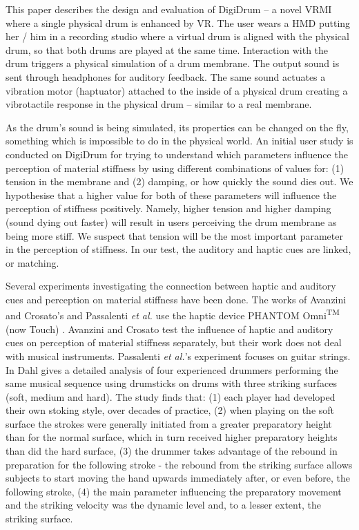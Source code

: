 \documentclass{article}
\begin{document}
This paper describes the design and evaluation of DigiDrum -- a novel VRMI where a single physical drum is enhanced by VR. The user wears a HMD putting her / him in a recording studio where a virtual drum is aligned with the physical drum, so that both drums are played at the same time. Interaction with the drum triggers a physical simulation of a drum membrane. The output sound is sent through headphones for auditory feedback. The same sound actuates a vibration motor (haptuator) attached to the inside of a physical drum creating a vibrotactile response in the physical drum -- similar to a real membrane.

As the drum's sound is being simulated, its properties can be changed on the fly, something which is impossible to do in the physical world. An initial user study is conducted on DigiDrum for trying to understand which parameters influence the perception of material stiffness by using different combinations of values for: (1) tension in the membrane and (2) damping, or how quickly the sound dies out. We hypothesise that a higher value for both of these parameters will influence the perception of stiffness positively. Namely, higher tension and higher damping (sound dying out faster) will result in users perceiving the drum membrane as being more stiff. We suspect that tension will be the most important parameter in the perception of stiffness. In our test, the auditory and haptic cues are linked, or matching. 

Several experiments investigating the connection between haptic and auditory cues and perception on material stiffness have been done. The works of 
Avanzini and Crosato's \cite{avanzini2006} and Passalenti \emph{et al.}  \cite{passalenti2019} use the haptic device PHANTOM\textregistered{} Omni\textsuperscript{TM} (now Touch) \cite{phantom}. Avanzini and Crosato test the influence of haptic and auditory cues on perception of material stiffness separately, but their work does not deal with musical instruments. Passalenti \emph{et al.}'s experiment focuses on guitar strings. In 
\cite{Dahl:2004} Dahl gives a detailed analysis of four experienced drummers performing the same musical sequence using drumsticks on drums with three striking surfaces (soft, medium and hard). The study finds that: (1) each player had developed their own stoking style, over decades of practice, (2) when playing on the soft surface the strokes were generally initiated from a greater preparatory height than for the normal surface, which in turn received higher preparatory heights than did the hard surface, (3) the drummer takes advantage of the rebound in preparation for the following stroke - the rebound from the striking surface allows subjects to start moving the hand upwards immediately after, or even before, the following stroke, (4) the main parameter influencing the preparatory movement and the striking velocity was the dynamic level and, to a lesser extent, the striking surface.
\end{document}
